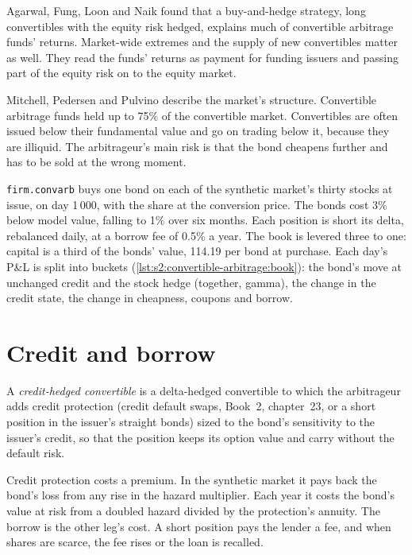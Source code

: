 Agarwal, Fung, Loon and Naik found that a buy-and-hedge strategy, long convertibles with the equity risk hedged, explains much of convertible arbitrage
funds' returns. Market-wide extremes and the supply of new convertibles matter as well. They read the funds' returns as payment for funding issuers
and passing part of the equity risk on to the equity market.

Mitchell, Pedersen and Pulvino describe the market's structure. Convertible arbitrage funds held up to 75\% of the convertible market. Convertibles
are often issued below their fundamental value and go on trading below it, because they are illiquid. The arbitrageur's main risk is that the bond
cheapens further and has to be sold at the wrong moment.

\texttt{firm.convarb} buys one bond on each of the synthetic market's thirty stocks at issue, on day 1\,000, with the share at the conversion price.
The bonds cost 3\% below model value, falling to 1\% over six months. Each position is short its delta, rebalanced daily, at a borrow fee of 0.5\% a
year. The book is levered three to one: capital is a third of the bonds' value, 114.19 per bond at purchase. Each day's P\&L is split into buckets
(\cref{lst:s2:convertible-arbitrage:book}): the bond's move at unchanged credit and the stock hedge (together, gamma), the change in the credit
state, the change in cheapness, coupons and borrow.

\section{Credit and borrow}

\begin{definition}\label{def:s2:convertible-arbitrage:credit}
A \emph{credit-hedged convertible} is a delta-hedged convertible to which the arbitrageur adds credit protection
(credit default swaps, Book~2, chapter~23, or a short position in the issuer's straight bonds) sized to the bond's sensitivity to the issuer's
credit, so that the position keeps its option value and carry without the default risk.
\end{definition}

Credit protection costs a premium. In the synthetic market it pays back the bond's loss from any rise in the hazard multiplier. Each year it costs the
bond's value at risk from a doubled hazard divided by the protection's annuity. The borrow is the other leg's cost. A short position pays the lender a
fee, and when shares are scarce, the fee rises or the loan is recalled.

